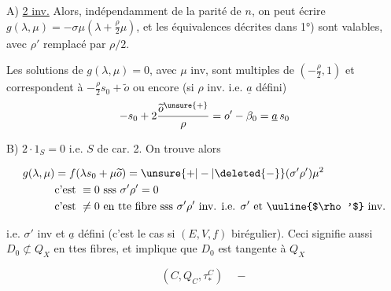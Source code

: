 A) \uline{2 inv.}\quad {} Alors, indépendamment de la parité de $n$, on peut écrire $g(\lambda,\mu)=-\sigma\mu(\lambda+\frac{\rho}{2}\mu)$, et les équivalences décrites dans 1°) sont valables, avec $\rho'$ remplacé par $\rho/2$.


Les solutions de $g(\lambda,\mu)=0$, avec $\mu$ inv, sont multiples de $(-\frac{\rho}{2},1)$ et correspondent à $-\frac{\rho}{2}s_0+\widetilde{o}$ ou encore  (si $\rho$ inv. i.e. $\underline a$ défini)
\[
-s_0+2\frac{\widetilde{o}^{\unsure{+}}}{\rho}=o'-\beta_0=\underline a\,s_0
\]

B) $2\cdot1_S=0$ i.e. $S$ de car. 2. On trouve alors 

\[
\begin{aligned}
g(\lambda,\mu)&=f(\lambda s_0+\mu\widetilde{o})=\unsure{+|-|\deleted{-}}(\sigma'\rho')\mu^2\\
&\text{c'est }\equiv0\text{ sss }\sigma'\rho'=0\\
&\text{c'est }\ne0\text{ en tte fibre sss }\sigma'\rho'\text{ inv. i.e. }\sigma'\text{ et }\text{\uuline{$\rho'$}}\text{ inv.}
\end{aligned}
\]


i.e. $\sigma'$ inv et $\underline a$  défini (c'est le cas si $(E,V,f)$ birégulier).  Ceci signifie aussi $D_0\not\subset Q_X$ en ttes fibres, et implique que $D_0$ est tangente à $Q_X$



\[
(C,Q_C,\tau_*^C)\quad -
\]


